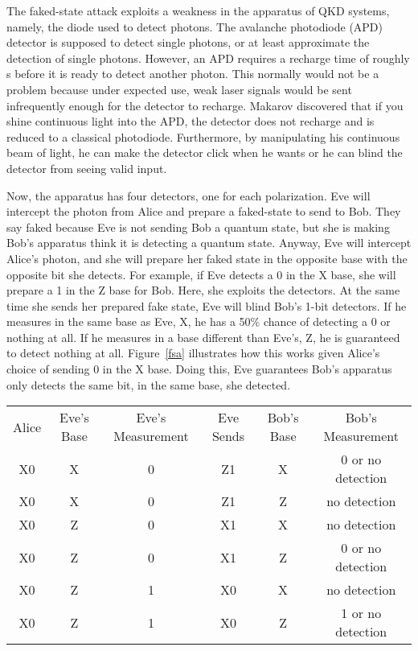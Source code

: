 \documentclass[12pt,twocolumn]{article}
\begin{document}
The faked-state attack exploits a weakness in the apparatus of QKD systems, namely, the diode used to detect photons\cite{makarov:06,makarov:09}. The avalanche photodiode (APD) detector is supposed to detect single photons, or at least approximate the detection of single photons. However, an APD requires a recharge time of roughly s before it is ready to detect another photon. This normally would not be a problem because under expected use, weak laser signals would be sent infrequently enough for the detector to recharge. Makarov discovered that if you shine continuous light into the APD, the detector does not recharge and is reduced to a classical photodiode. Furthermore, by manipulating his continuous beam of light, he can make the detector click when he wants or he can blind the detector from seeing valid input.

Now, the apparatus has four detectors, one for each polarization. Eve will intercept the photon from Alice and prepare a faked-state to send to Bob. They say faked because Eve is not sending Bob a quantum state, but she is making Bob's apparatus think it is detecting a quantum state. Anyway, Eve will intercept Alice's photon, and she will prepare her faked state in the opposite base with the opposite bit she detects. For example, if Eve detects a 0 in the X base, she will prepare a 1 in the Z base for Bob. Here, she exploits the detectors. At the same time she sends her prepared fake state, Eve will blind Bob's 1-bit detectors. If he measures in the same base as Eve, X, he has a 50\% chance of detecting a 0 or nothing at all. If he measures in a base different than Eve's, Z, he is guaranteed to detect nothing at all. Figure~\ref{fsa} illustrates how this works given Alice's choice of sending 0 in the X base. Doing this, Eve guarantees Bob's apparatus only detects the same bit, in the same base, she detected.
\begin{table*}[tbp] \centering
\begin{tabular}{|c c c c c c|}
\hline
Alice & Eve's Base & Eve's Measurement & Eve Sends & Bob's Base & Bob's Measurement\\
X0 & X & 0 & Z1 & X & 0 or no detection\\
X0 & X & 0 & Z1 & Z & no detection\\
X0 & Z & 0 & X1 & X & no detection\\
X0 & Z & 0 & X1 & Z & 0 or no detection\\
X0 & Z & 1 & X0 & X & no detection\\
X0 & Z & 1 & X0 & Z & 1 or no detection\\
\hline
\end{tabular}
\caption[Eve's faked-stage attack]{Eve's faked-stage attack. Note Eve's measurement in the bottom for has a 50\% chance of detecting a 0 or a 1 since she uses an incompatible base to Alice's base.\label{fsa}}
\end{table*}
\end{document}
